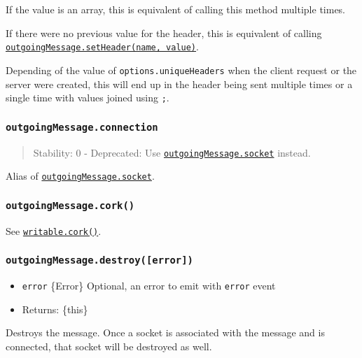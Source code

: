 If the value is an array, this is equivalent of calling this method
multiple times.

If there were no previous value for the header, this is equivalent of
calling
\hyperref[outgoingmessagesetheadername-value]{\texttt{outgoingMessage.setHeader(name,\ value)}}.

Depending of the value of \texttt{options.uniqueHeaders} when the client
request or the server were created, this will end up in the header being
sent multiple times or a single time with values joined using
\texttt{;}.

\subsubsection{\texorpdfstring{\texttt{outgoingMessage.connection}}{outgoingMessage.connection}}\label{outgoingmessage.connection}

\begin{quote}
Stability: 0 - Deprecated: Use
\hyperref[outgoingmessagesocket]{\texttt{outgoingMessage.socket}}
instead.
\end{quote}

Alias of
\hyperref[outgoingmessagesocket]{\texttt{outgoingMessage.socket}}.

\subsubsection{\texorpdfstring{\texttt{outgoingMessage.cork()}}{outgoingMessage.cork()}}\label{outgoingmessage.cork}

See \href{stream.md\#writablecork}{\texttt{writable.cork()}}.

\subsubsection{\texorpdfstring{\texttt{outgoingMessage.destroy({[}error{]})}}{outgoingMessage.destroy({[}error{]})}}\label{outgoingmessage.destroyerror}

\begin{itemize}
\tightlist
\item
  \texttt{error} \{Error\} Optional, an error to emit with
  \texttt{error} event
\item
  Returns: \{this\}
\end{itemize}

Destroys the message. Once a socket is associated with the message and
is connected, that socket will be destroyed as well.


